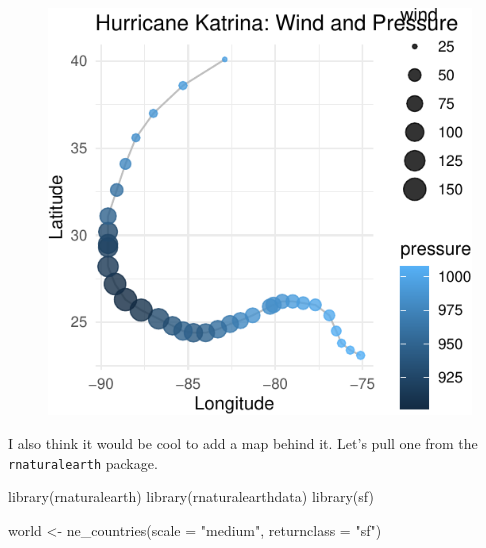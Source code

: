 \documentclass[
  letterpaper,
  DIV=11,
  numbers=noendperiod]{scrartcl}
\newenvironment{Shaded}{\begin{snugshade}}{\end{snugshade}}
\newcommand{\AttributeTok}[1]{\textcolor[rgb]{0.40,0.45,0.13}{#1}}
\newcommand{\FunctionTok}[1]{\textcolor[rgb]{0.28,0.35,0.67}{#1}}
\newcommand{\NormalTok}[1]{\textcolor[rgb]{0.00,0.23,0.31}{#1}}
\newcommand{\OtherTok}[1]{\textcolor[rgb]{0.00,0.23,0.31}{#1}}
\newcommand{\StringTok}[1]{\textcolor[rgb]{0.13,0.47,0.30}{#1}}
\begin{document}
\begin{figure}[H]

{\centering \includegraphics{118_gganimate_files/figure-pdf/unnamed-chunk-4-1.pdf}

}

\end{figure}

I also think it would be cool to add a map behind it. Let's pull one
from the \texttt{rnaturalearth} package.

\begin{Shaded}
\begin{Highlighting}[]
\FunctionTok{library}\NormalTok{(rnaturalearth)}
\FunctionTok{library}\NormalTok{(rnaturalearthdata)}
\FunctionTok{library}\NormalTok{(sf)}

\NormalTok{world }\OtherTok{\textless{}{-}} \FunctionTok{ne\_countries}\NormalTok{(}\AttributeTok{scale =} \StringTok{"medium"}\NormalTok{, }\AttributeTok{returnclass =} \StringTok{"sf"}\NormalTok{)}
\end{Highlighting}
\end{Shaded}
\end{document}
